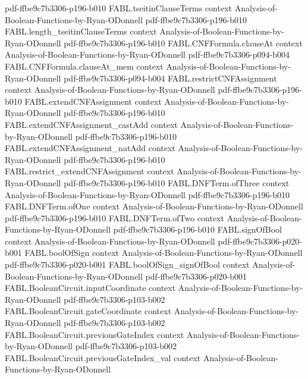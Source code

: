 \begin{theorem}
  {pdf-ffbe9c7b3306-p196-b010}
\proofstep
  {FABL.tseitinClauseTerms}
  {context}
  {Analysis-of-Boolean-Functions-by-Ryan-ODonnell}
  {pdf-ffbe9c7b3306-p196-b010}
\proofstep
  {FABL.length_tseitinClauseTerms}
  {context}
  {Analysis-of-Boolean-Functions-by-Ryan-ODonnell}
  {pdf-ffbe9c7b3306-p196-b010}
\proofstep
  {FABL.CNFFormula.clauseAt}
  {context}
  {Analysis-of-Boolean-Functions-by-Ryan-ODonnell}
  {pdf-ffbe9c7b3306-p094-b004}
\proofstep
  {FABL.CNFFormula.clauseAt_mem}
  {context}
  {Analysis-of-Boolean-Functions-by-Ryan-ODonnell}
  {pdf-ffbe9c7b3306-p094-b004}
\proofstep
  {FABL.restrictCNFAssignment}
  {context}
  {Analysis-of-Boolean-Functions-by-Ryan-ODonnell}
  {pdf-ffbe9c7b3306-p196-b010}
\proofstep
  {FABL.extendCNFAssignment}
  {context}
  {Analysis-of-Boolean-Functions-by-Ryan-ODonnell}
  {pdf-ffbe9c7b3306-p196-b010}
\proofstep
  {FABL.extendCNFAssignment_castAdd}
  {context}
  {Analysis-of-Boolean-Functions-by-Ryan-ODonnell}
  {pdf-ffbe9c7b3306-p196-b010}
\proofstep
  {FABL.extendCNFAssignment_natAdd}
  {context}
  {Analysis-of-Boolean-Functions-by-Ryan-ODonnell}
  {pdf-ffbe9c7b3306-p196-b010}
\proofstep
  {FABL.restrict_extendCNFAssignment}
  {context}
  {Analysis-of-Boolean-Functions-by-Ryan-ODonnell}
  {pdf-ffbe9c7b3306-p196-b010}
\proofstep
  {FABL.DNFTerm.ofThree}
  {context}
  {Analysis-of-Boolean-Functions-by-Ryan-ODonnell}
  {pdf-ffbe9c7b3306-p196-b010}
\proofstep
  {FABL.DNFTerm.ofOne}
  {context}
  {Analysis-of-Boolean-Functions-by-Ryan-ODonnell}
  {pdf-ffbe9c7b3306-p196-b010}
\proofstep
  {FABL.DNFTerm.ofTwo}
  {context}
  {Analysis-of-Boolean-Functions-by-Ryan-ODonnell}
  {pdf-ffbe9c7b3306-p196-b010}
\proofstep
  {FABL.signOfBool}
  {context}
  {Analysis-of-Boolean-Functions-by-Ryan-ODonnell}
  {pdf-ffbe9c7b3306-p020-b001}
\proofstep
  {FABL.boolOfSign}
  {context}
  {Analysis-of-Boolean-Functions-by-Ryan-ODonnell}
  {pdf-ffbe9c7b3306-p020-b001}
\proofstep
  {FABL.boolOfSign_signOfBool}
  {context}
  {Analysis-of-Boolean-Functions-by-Ryan-ODonnell}
  {pdf-ffbe9c7b3306-p020-b001}
\proofstep
  {FABL.BooleanCircuit.inputCoordinate}
  {context}
  {Analysis-of-Boolean-Functions-by-Ryan-ODonnell}
  {pdf-ffbe9c7b3306-p103-b002}
\proofstep
  {FABL.BooleanCircuit.gateCoordinate}
  {context}
  {Analysis-of-Boolean-Functions-by-Ryan-ODonnell}
  {pdf-ffbe9c7b3306-p103-b002}
\proofstep
  {FABL.BooleanCircuit.previousGateIndex}
  {context}
  {Analysis-of-Boolean-Functions-by-Ryan-ODonnell}
  {pdf-ffbe9c7b3306-p103-b002}
\proofstep
  {FABL.BooleanCircuit.previousGateIndex_val}
  {context}
  {Analysis-of-Boolean-Functions-by-Ryan-ODonnell}

\end{theorem}
